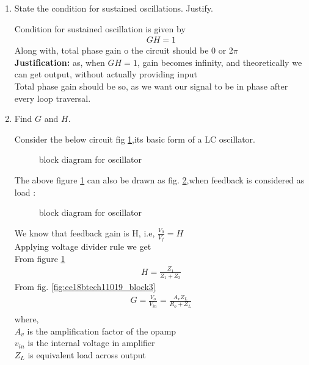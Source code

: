 \begin{enumerate}[label=\thesection.\arabic*.,ref=\thesection.\theenumi]
\item State the condition for sustained oscillations. Justify.

\solution Condition for sustained oscillation is given by\\
\begin{align}
    GH = 1
\end{align}
Along with, total phase gain o the circuit should be 0 or 2$\pi$\\
\textbf{Justification:} as, when $ GH =1 $, gain becomes infinity, and theoretically we can get output, without actually providing input\\
Total phase gain should be so, as we want our signal to be in phase after every loop traversal.\\


\item Find $G$ and $H$.

\solution Consider the below circuit fig \ref{fig:ee18btech11019_block2},its basic form of a LC oscillator.\\
\begin{figure}[!ht]
    \begin{center}
		\resizebox{\columnwidth}{!}{}
		
	\end{center}
\caption{block diagram for oscillator}
\label{fig:ee18btech11019_block2}
\end{figure}
The above figure \ref{fig:ee18btech11019_block2} can also be drawn as fig. \ref{fig:ee18btech11019_block3},when feedback is considered as load :\\
\begin{figure}[!ht]
    \begin{center}
		\resizebox{\columnwidth}{!}{}
		
	\end{center}
\caption{block diagram for oscillator}
\label{fig:ee18btech11019_block3}
\end{figure}
We know that feedback gain is H, i.e, $\frac{V_0}{V_f} = H$\\
Applying voltage divider rule we get\\
From figure \ref{fig:ee18btech11019_block2}
\begin{align}
    H = \frac{Z_1}{Z_1 + Z_3}
\end{align}
From fig. \eqref{fig:ee18btech11019_block3}
\begin{align}
    G = \frac{V_o}{V_{in}} = \frac{A_vZ_L}{R_o + Z_L}\\
\end{align}    
    where,\\
    $A_v$ is the amplification factor of the opamp\\
    $v_{in}$ is the internal voltage in amplifier\\
    $Z_L$ is equivalent load across output
         

\end{enumerate}
